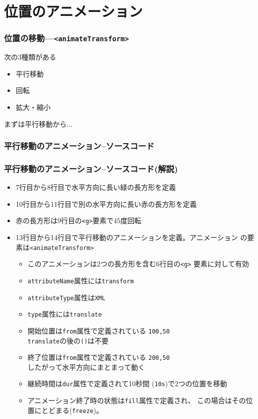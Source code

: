  \section{位置のアニメーション}
\begin{frame}[containsverbatim]
 \frametitle{位置の移動---\texttt{<animateTransform>}}
 次の3種類がある
\begin{itemize}
 \item 平行移動
 \item 回転
 \item 拡大・縮小
\end{itemize}
 まずは平行移動から...
\end{frame}
\begin{frame}[containsverbatim]
 \frametitle{平行移動のアニメーション--ソースコード}
\end{frame}
\begin{frame}[containsverbatim]
 \frametitle{平行移動のアニメーション--ソースコード(解説)}
 \begin{itemize}
  \item 7行目から8行目で水平方向に長い緑の長方形を定義
  \item 10行目から11行目で別の水平方向に長い赤の長方形を定義
  \item 赤の長方形は9行目の\texttt{<g>}要素で$45$度回転
  \item 13行目から14行目で平行移動のアニメーションを定義。アニメーション
        の要素は\texttt{<animateTransform>}
        \begin{itemize}
         \item このアニメーションは2つの長方形を含む6行目の\texttt{<g>}
               要素に対して有効
         \item \texttt{attributeName}属性には\texttt{transform}
         \item \texttt{attributeType}属性は\texttt{XML}
         \item \texttt{type}属性には\texttt{translate}
         \item 開始位置は\texttt{from}属性で定義されている
               \texttt{100,50}\\
               \texttt{translate}の後の\texttt{()}は不要
         \item 終了位置は\texttt{from}属性で定義されている
               \texttt{200,50}\\
               したがって水平方向にまとまって動く
         \item 継続時間は\texttt{dur}属性で定義されて10秒間
               (\texttt{10s})で2つの位置を移動
         \item アニメーション終了時の状態は\texttt{fill}属性で定義され、
               この場合はその位置にとどまる(\texttt{freeze})。
        \end{itemize}
 \end{itemize}
\end{frame}
